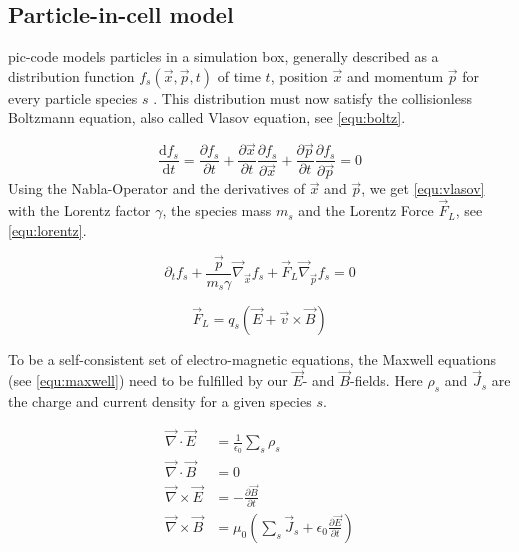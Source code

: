 \documentclass[bachelor_thesis]{subfiles}
\begin{document}
\subsection{Particle-in-cell model} \label{chap:pic}
\Gls{pic}-code models particles in a simulation box, generally described as a distribution function $f_s(\vec{x}, \vec{p}, t)$ of time $t$, position $\vec{x}$ and momentum $\vec{p}$ for every particle species $s$ \cite{PICRepo, Derouillat2017}.
This distribution must now satisfy the collisionless Boltzmann equation, also called Vlasov equation\cite{Vlasov1968}, see \autoref{equ:boltz}.

\begin{equation}
	\frac{\mathrm{d}f_s}{\mathrm{d}t}=\frac{\partial f_s}{\partial t} + \frac{\partial \vec{x}}{\partial t} \frac{\partial f_s}{\partial \vec{x}} + \frac{\partial \vec{p}}{\partial t} \frac{\partial f_s}{\partial \vec{p}} = 0
	\label{equ:boltz}
\end{equation}
Using the Nabla-Operator and the derivatives of $\vec{x}$ and $\vec{p}$, we get \autoref{equ:vlasov} with the Lorentz factor $\gamma$, the species mass $m_s$ and the Lorentz Force $\vec{F}_L$, see \autoref{equ:lorentz}.

\begin{equation}
	\partial_t f_s + \frac{\vec{p}}{m_s \gamma} \vec{\nabla}_{\vec{x}} f_s + \vec{F}_L \vec{\nabla}_{\vec{p}} f_s = 0
	\label{equ:vlasov}
\end{equation}

\begin{equation}
	\vec{F}_L=q_s\left(\vec{E}+\vec{v}\times\vec{B}\right)
	\label{equ:lorentz}
\end{equation}

To be a self-consistent set of electro-magnetic equations, the Maxwell equations (see \autoref{equ:maxwell}) need to be fulfilled by our $\vec{E}$- and $\vec{B}$-fields. Here $\rho_s$ and $\vec{J}_s$ are the charge and current density for a given species $s$.

\begin{equation}
\begin{aligned}
	\vec{\nabla}\cdotp\vec{E}  &= \frac{1}{\epsilon_0}\sum_s \rho_s 									\\
	\vec{\nabla}\cdotp\vec{B}  &= 0 														\\
	\vec{\nabla}\times\vec{E} &= -\frac{\partial \vec{B}}{\partial t}									\\
	\vec{\nabla}\times\vec{B}&= \mu_0 \left(\sum_s \vec{J}_s + \epsilon_0 \frac{\partial \vec{E}}{\partial t}\right)	
\end{aligned}
\label{equ:maxwell}
\end{equation}
\end{document}
